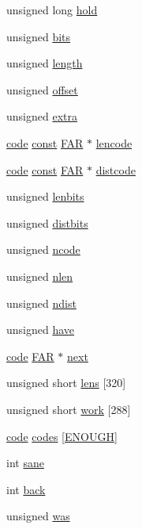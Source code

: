 \begin{DoxyCompactItemize}
\item 
unsigned long \hyperlink{structinflate__state_a5a91b1c59e52f1aa7eda75b86b05b843}{hold}
\item 
unsigned \hyperlink{structinflate__state_ab37c3563f306f29e6ded8e933af14365}{bits}
\item 
unsigned \hyperlink{structinflate__state_a5179d4c9b332d976cce7c6cce6bdf3c1}{length}
\item 
unsigned \hyperlink{structinflate__state_af1e38258e8585b1a37854066ef9d939c}{offset}
\item 
unsigned \hyperlink{structinflate__state_a5b7b0be77d61e8468716c7f265dd0780}{extra}
\item 
\hyperlink{structcode}{code} \hyperlink{zconf_8h_a2c212835823e3c54a8ab6d95c652660e}{const} \hyperlink{zconf_8h_aef060b3456fdcc093a7210a762d5f2ed}{F\+AR} $\ast$ \hyperlink{structinflate__state_a4560e1eb3318f7ea41896be84de0679a}{lencode}
\item 
\hyperlink{structcode}{code} \hyperlink{zconf_8h_a2c212835823e3c54a8ab6d95c652660e}{const} \hyperlink{zconf_8h_aef060b3456fdcc093a7210a762d5f2ed}{F\+AR} $\ast$ \hyperlink{structinflate__state_a19f7ae2fe2682cb1163860f6991a107f}{distcode}
\item 
unsigned \hyperlink{structinflate__state_a3ff97e6b230d7551fc848ff9de0236e9}{lenbits}
\item 
unsigned \hyperlink{structinflate__state_a98952f3f8f420a05b567f080aca0eb4b}{distbits}
\item 
unsigned \hyperlink{structinflate__state_a62b5ea8559856b315b6c89d9114c2109}{ncode}
\item 
unsigned \hyperlink{structinflate__state_a489b005f4fe214353cd80b77b4f23194}{nlen}
\item 
unsigned \hyperlink{structinflate__state_a4415e5e51efdd0c8672e4c601caa4762}{ndist}
\item 
unsigned \hyperlink{structinflate__state_a4a2b15912256bcf7b39980e15095ba58}{have}
\item 
\hyperlink{structcode}{code} \hyperlink{zconf_8h_aef060b3456fdcc093a7210a762d5f2ed}{F\+AR} $\ast$ \hyperlink{structinflate__state_a872bf267d91efb4143e9cfb812e670bb}{next}
\item 
unsigned short \hyperlink{structinflate__state_aa0620e64487c48635f6c3a11a0aeb99d}{lens} \mbox{[}320\mbox{]}
\item 
unsigned short \hyperlink{structinflate__state_a85403907f7f5b9d355821ffa2591456c}{work} \mbox{[}288\mbox{]}
\item 
\hyperlink{structcode}{code} \hyperlink{structinflate__state_af9581f523a7d8d47fba6cdd73eaf1edc}{codes} \mbox{[}\hyperlink{inftrees_8h_acef2f42f16f168d23ec870bd60a3b5f1}{E\+N\+O\+U\+GH}\mbox{]}
\item 
int \hyperlink{structinflate__state_a98b40fe23b7177bc8cd1d9d73edad593}{sane}
\item 
int \hyperlink{structinflate__state_ab666ce74a806fc77200ced9bc385cb0b}{back}
\item 
unsigned \hyperlink{structinflate__state_a0e3af9175f6d3b30f83af69062ba4dec}{was}
\end{DoxyCompactItemize}


